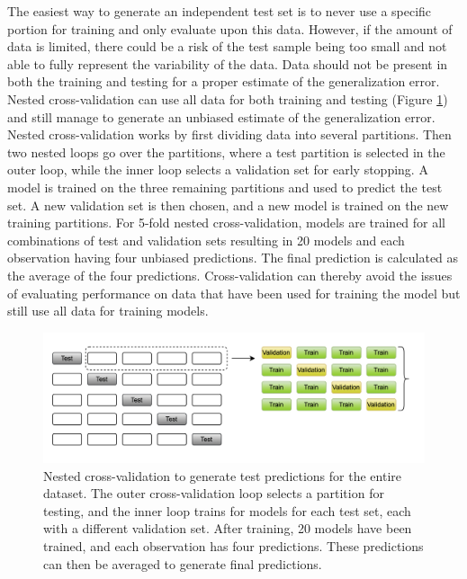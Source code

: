 The easiest way to generate an independent test set is to never use a specific portion for training and only evaluate upon this data. However, if the amount of data is limited, there could be a risk of the test sample being too small and not able to fully represent the variability of the data. Data should not be present in both the training and testing for a proper estimate of the generalization error. Nested cross-validation can use all data for both training and testing (Figure \ref{fig:cv}) and still manage to generate an unbiased estimate of the generalization error. Nested cross-validation works by first dividing data into several partitions. Then two nested loops go over the partitions, where a test partition is selected in the outer loop, while the inner loop selects a validation set for early stopping. A model is trained on the three remaining partitions and used to predict the test set. A new validation set is then chosen, and a new model is trained on the new training partitions. For 5-fold nested cross-validation, models are trained for all combinations of test and validation sets resulting in 20 models and each observation having four unbiased predictions. The final prediction is calculated as the average of the four predictions. Cross-validation can thereby avoid the issues of evaluating performance on data that have been used for training the model but still use all data for training models.
\begin{figure}
    \centering
    \includegraphics[width=\linewidth]{figures/cross_validation.png}
    \caption{Nested cross-validation to generate test predictions for the entire dataset. The outer cross-validation loop selects a partition for testing, and the inner loop trains for models for each test set, each with a different validation set. After training, 20 models have been trained, and each observation has four predictions. These predictions can then be averaged to generate final predictions.}
    \label{fig:cv}
\end{figure}

